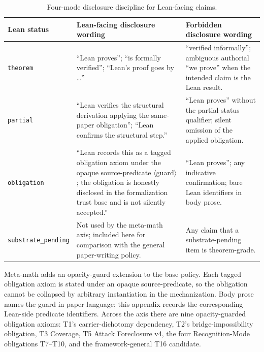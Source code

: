 \documentclass[11pt]{article}
\theoremstyle{definition}
\begin{document}
\begin{table}[H]
\centering
\small
\begin{tabularx}{\textwidth}{@{}
  >{\raggedright\arraybackslash}p{}
  >{\raggedright\arraybackslash}X
  >{\raggedright\arraybackslash}X@{}}
\toprule
Lean status & Lean-facing disclosure wording & Forbidden disclosure wording \\
\midrule
\texttt{theorem}
  & ``Lean proves''; ``is formally verified''; ``Lean's proof goes by \dots''
  & ``verified informally''; ambiguous authorial ``we prove'' when the intended claim is the Lean result. \\
\texttt{partial}
  & ``Lean verifies the structural derivation applying the same-paper obligation''; ``Lean confirms the structural step.''
  & ``Lean proves'' without the partial-status qualifier; silent omission of the applied obligation. \\
\texttt{obligation}
  & ``Lean records this as a tagged obligation axiom under the opaque source-predicate \(\langle\)guard\(\rangle\); the obligation is honestly disclosed in the formalization trust base and is not silently accepted.''
  & ``Lean proves''; any indicative confirmation; bare Lean identifiers in body prose. \\
\texttt{substrate\_}\newline\texttt{pending}
  & Not used by the meta-math axis; included here for comparison with the general paper-writing policy.
  & Any claim that a substrate-pending item is theorem-grade. \\
\bottomrule
\end{tabularx}
\caption{Four-mode disclosure discipline for Lean-facing claims.}
\label{tab:appd:wording-discipline}
\end{table}

Meta-math adds an opacity-guard extension to the base policy.  Each
tagged obligation axiom is stated under an opaque source-predicate, so
the obligation cannot be collapsed by arbitrary instantiation in the
mechanization.  Body prose names the guard in paper language; this
appendix records the corresponding Lean-side predicate identifiers.
Across the axis there are nine opacity-guarded obligation axioms:
T1's carrier-dichotomy dependency, T2's bridge-impossibility
obligation, T3 Coverage, T5 Attack Foreclosure v4, the four
Recognition-Mode obligations T7--T10, and the framework-general T16
candidate.
\end{document}
